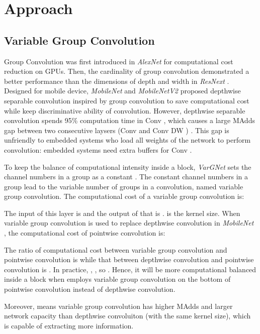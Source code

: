 \documentclass[10pt,twocolumn,letterpaper]{article}
\begin{document}
\section{Approach}


\subsection{Variable Group Convolution}
Group Convolution was first introduced in \textit{AlexNet} \cite{alexnet} for computational cost reduction on GPUs. Then, the cardinality of group convolution demonstrated a better performance than the dimensions of depth and width in \textit{ResNext}   \cite{xie2017aggregated}. Designed for mobile device, \textit{MobileNet} \cite{mobilenet} and \textit{MobileNetV2} \cite{mobilenetv2} proposed depthwise separable convolution inspired by group convolution to save computational cost while keep discriminative ability of convolution. However, depthwise separable convolution spends 95\% computation time in Conv , which causes a large MAdds gap between two consecutive laysers (Conv  and Conv DW ) \cite{mobilenet}. This gap is unfriendly to embedded systems who load all weights of the network to perform convolution\cite{xing2019dnnvm}: embedded systems need extra buffers for Conv .

To keep the balance of computational intensity inside a block, \textit{VarGNet} \cite{vargnet} sets the channel numbers in a group as a constant . The constant channel numbers in a group lead to the variable number of groups  in a convolution, named variable group convolution. The computational cost of a variable group convolution is:





The input of this layer is  and the output of that is  .  is the kernel size. When variable group convolution is used to replace depthwise convolution in \textit{MobileNet} \cite{mobilenet}, the computational cost of pointwise convolution is:

The ratio of computational cost between variable group convolution and pointwise convolution is  while that between depthwise convolution and pointwise convolution is . In practice, , , so  . Hence, it will be more computational balanced inside a block when employs variable group convolution  on the bottom of pointwise convolution instead of depthwise convolution.

Moreover,  means variable group convolution has higher MAdds and larger network capacity than depthwise convoluiton (with the same kernel size), which is capable of extracting more information.
\end{document}
